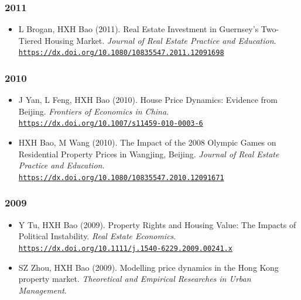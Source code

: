 \documentclass[11pt,a4paper]{article}
\providecommand{\tightlist}{%
  \setlength{\itemsep}{1pt}\setlength{\parskip}{0pt}}
\begin{document}
\subsubsection{2011}\label{section-13}

\begin{itemize}
\tightlist
\item
  L Brogan, HXH Bao (2011). Real Estate Investment in Guernsey's
  Two-Tiered Housing Market. \emph{Journal of Real Estate Practice and
  Education}.
  \href{https://dx.doi.org/10.1080/10835547.2011.12091698}{\nolinkurl{https://dx.doi.org/10.1080/10835547.2011.12091698}}
\end{itemize}

\subsubsection{2010}\label{section-14}

\begin{itemize}
\tightlist
\item
  J Yan, L Feng, HXH Bao (2010). House Price Dynamics: Evidence from
  Beijing. \emph{Frontiers of Economics in China}.
  \href{https://dx.doi.org/10.1007/s11459-010-0003-6}{\nolinkurl{https://dx.doi.org/10.1007/s11459-010-0003-6}}
\item
  HXH Bao, M Wang (2010). The Impact of the 2008 Olympic Games on
  Residential Property Prices in Wangjing, Beijing. \emph{Journal of
  Real Estate Practice and Education}.
  \href{https://dx.doi.org/10.1080/10835547.2010.12091671}{\nolinkurl{https://dx.doi.org/10.1080/10835547.2010.12091671}}
\end{itemize}

\subsubsection{2009}\label{section-15}

\begin{itemize}
\tightlist
\item
  Y Tu, HXH Bao (2009). Property Rights and Housing Value: The Impacts
  of Political Instability. \emph{Real Estate Economics}.
  \href{https://dx.doi.org/10.1111/j.1540-6229.2009.00241.x}{\nolinkurl{https://dx.doi.org/10.1111/j.1540-6229.2009.00241.x}}
\item
  SZ Zhou, HXH Bao (2009). Modelling price dynamics in the Hong Kong
  property market. \emph{Theoretical and Empirical Researches in Urban
  Management}.
\end{itemize}
\end{document}
